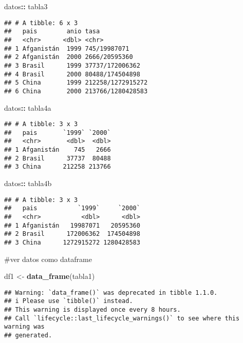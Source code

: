 \documentclass[
]{article}
\newenvironment{Shaded}{\begin{snugshade}}{\end{snugshade}}
\newcommand{\FunctionTok}[1]{\textcolor[rgb]{0.13,0.29,0.53}{\textbf{#1}}}
\newcommand{\NormalTok}[1]{#1}
\newcommand{\OtherTok}[1]{\textcolor[rgb]{0.56,0.35,0.01}{#1}}
\newcommand{\SpecialCharTok}[1]{\textcolor[rgb]{0.81,0.36,0.00}{\textbf{#1}}}
\begin{document}
\begin{Shaded}
\begin{Highlighting}[]
\NormalTok{datos}\SpecialCharTok{::}\NormalTok{ tabla3}
\end{Highlighting}
\end{Shaded}

\begin{verbatim}
## # A tibble: 6 x 3
##   pais        anio tasa             
##   <chr>      <dbl> <chr>            
## 1 Afganistán  1999 745/19987071     
## 2 Afganistán  2000 2666/20595360    
## 3 Brasil      1999 37737/172006362  
## 4 Brasil      2000 80488/174504898  
## 5 China       1999 212258/1272915272
## 6 China       2000 213766/1280428583
\end{verbatim}

\begin{Shaded}
\begin{Highlighting}[]
\NormalTok{datos}\SpecialCharTok{::}\NormalTok{ tabla4a}
\end{Highlighting}
\end{Shaded}

\begin{verbatim}
## # A tibble: 3 x 3
##   pais       `1999` `2000`
##   <chr>       <dbl>  <dbl>
## 1 Afganistán    745   2666
## 2 Brasil      37737  80488
## 3 China      212258 213766
\end{verbatim}

\begin{Shaded}
\begin{Highlighting}[]
\NormalTok{datos}\SpecialCharTok{::}\NormalTok{ tabla4b}
\end{Highlighting}
\end{Shaded}

\begin{verbatim}
## # A tibble: 3 x 3
##   pais           `1999`     `2000`
##   <chr>           <dbl>      <dbl>
## 1 Afganistán   19987071   20595360
## 2 Brasil      172006362  174504898
## 3 China      1272915272 1280428583
\end{verbatim}

\#ver datos como dataframe

\begin{Shaded}
\begin{Highlighting}[]
\NormalTok{df1 }\OtherTok{\textless{}{-}}  \FunctionTok{data\_frame}\NormalTok{(tabla1)}
\end{Highlighting}
\end{Shaded}

\begin{verbatim}
## Warning: `data_frame()` was deprecated in tibble 1.1.0.
## i Please use `tibble()` instead.
## This warning is displayed once every 8 hours.
## Call `lifecycle::last_lifecycle_warnings()` to see where this warning was
## generated.
\end{verbatim}
\end{document}
